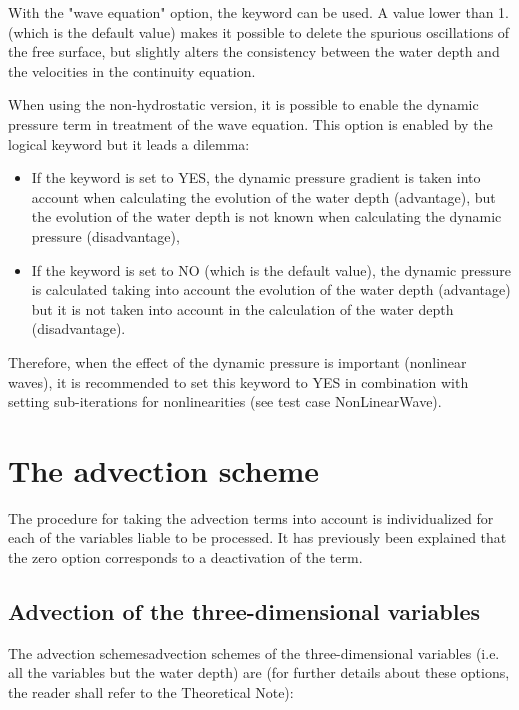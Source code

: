 With the "wave equation" option, the keyword  can be used. A value lower than 1. (which is the default value) makes
it possible to delete the spurious oscillations of the free surface, but
slightly alters the consistency between the water depth and the velocities in
the continuity equation.

When using the non-hydrostatic version, it is possible to enable the dynamic
pressure term in treatment of the wave equation. This option is enabled by the
logical keyword  but it leads a
dilemma:

\begin{itemize}
\item If the keyword is set to YES, the dynamic pressure gradient is taken
into account when calculating the evolution of the water depth (advantage), but
the evolution of the water depth is not known when calculating the dynamic
pressure (disadvantage),

\item If the keyword is set to NO (which is the default value), the dynamic
pressure is calculated taking into account the evolution of the water depth
(advantage) but it is not taken into account in the calculation of the water
depth (disadvantage).
\end{itemize}

Therefore, when the effect of the dynamic pressure is important (nonlinear
waves), it is recommended to set this keyword to YES in combination with
setting sub-iterations for nonlinearities (see test case NonLinearWave).


\section{The advection scheme}
\label{sec:advection}
The procedure for taking the advection terms into account is individualized
for each of the variables liable to be processed. It has previously been
explained that the zero option corresponds to a deactivation of the term.


\subsection{Advection of the three-dimensional variables}

The advection schemesadvection schemes of the three-dimensional variables (i.e.
all the variables but the water depth) are (for further details about these
options, the reader shall refer to the Theoretical Note):

